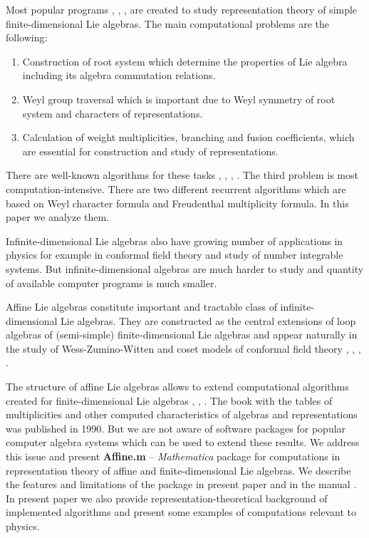 \documentclass[preprint,12pt]{elsarticle}
\begin{document}
Most popular programs \cite{simplie}, \cite{vanleeuwen1994lsp}, \cite{fischbacher2002ilp}, \cite{coxweyl} are created to study representation theory of simple finite-dimensional Lie algebras. The main computational problems are the following:
\begin{enumerate}
\item Construction of root system which determine the properties of Lie algebra including its algebra commutation relations.
\item Weyl group traversal which is important due to Weyl symmetry of root system and characters of representations.
\item Calculation of weight multiplicities, branching and fusion coefficients, which are essential for construction and study of representations. 
\end{enumerate}
There are well-known algorithms for these tasks \cite{moody1982fast}, \cite{stembridge2001computational}, \cite{belinfante1989survey}, \cite{casselman1994machine}. 
The third problem is most computation-intensive. There are two different recurrent algorithms which are based on Weyl character formula and Freudenthal multiplicity formula. In this paper we analyze them. 

Infinite-dimensional Lie algebras also have growing number of applications in physics for example in conformal field theory and study of number integrable systems. But infinite-dimensional algebras are much harder to study and quantity of available computer programs is much smaller.

Affine Lie algebras \cite{kac1990idl} constitute important and tractable class of infinite-dimensional Lie algebras. They are constructed as the central extensions of loop algebras of (semi-simple) finite-dimensional Lie algebras and appear naturally in the study of Wess-Zumino-Witten and coset models of conformal field theory \cite{Walton:1999xc}, \cite{difrancesco1997cft}, \cite{Goddard198588}, \cite{Dunbar:1992gh}. 

The structure of affine Lie algebras allows to extend computational algorithms created for finite-dimensional Lie algebras  \cite{Fuchs:1996dd}, \cite{gannon2001algorithms}, \cite{kass1990ala}. The book \cite{kass1990ala} with the tables of multiplicities and other computed characteristics of algebras and representations was published in 1990. But we are not aware of software packages for popular computer algebra systems which can be used to extend these results. 
We address this issue and present {\bf Affine.m} -- {\it Mathematica} package for computations in representation theory of affine and finite-dimensional Lie algebras.  We describe the features and limitations of the package in present paper and in the manual \cite{affinemanual}. In present paper we also provide representation-theoretical background of implemented algorithms and present some examples of computations relevant to physics. 
\end{document}

